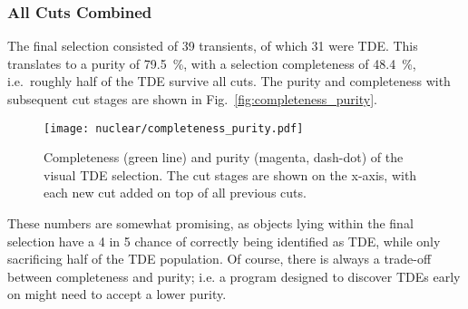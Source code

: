 \subsubsection{All Cuts Combined}
The final selection consisted of 39 transients, of which 31 were TDE. This translates to a purity of \SI{79.5}{\percent}, with a selection completeness of \SI{48.4}{\percent}, i.e.~roughly half of the TDE survive all cuts.
The purity and completeness with subsequent cut stages are shown in Fig.~\ref{fig:completeness_purity}.

\begin{figure}[htpb]
  \texttt{[image: nuclear/completeness\_purity.pdf]}
  \caption[Visual TDE selection]{Completeness (green line) and purity (magenta, dash-dot) of the visual TDE selection. The cut stages are shown on the x-axis, with each new cut added on top of all previous cuts.}
\end{figure}

These numbers are somewhat promising, as objects lying within the final selection have a 4 in 5 chance of correctly being identified as TDE, while only sacrificing half of the TDE population. Of course, there is always a trade-off between completeness and purity; i.e. a program designed to discover TDEs early on might need to accept a lower purity.

